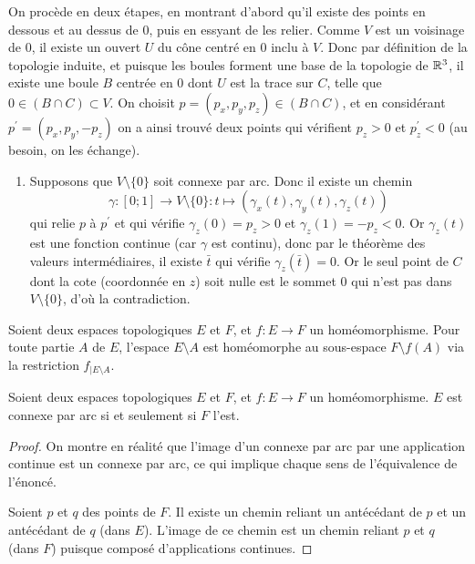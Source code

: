 On procède en deux étapes, en montrant d'abord qu'il
   existe des points en \og dessous\fg{} et au \og dessus\fg{} de
   $0$, puis en essyant de les relier.
     Comme $V$ est un voisinage de $0$, il existe un ouvert $U$ du
     cône centré en $0$ inclu à $V$. Donc par définition de la
     topologie induite, et puisque les boules forment une base de la
     topologie de $\mathbb{R}^3$, il existe une boule $B$ centrée en $0$ dont
     $U$ est la trace sur $C$, telle que $0 \in (B \cap C) \subset
     V$. On choisit $p = (p_x,p_y,p_z) \in (B \cap C)$, et en
     considérant $p^\prime = (p_x, p_y, -p_z)$ on a ainsi trouvé deux
     points qui vérifient $p_z > 0$ et $p^\prime_z < 0$ (au besoin,
     on les échange).

   \begin{enumerate}
   \item Supposons que $V\setminus\{0\}$ soit connexe par arc. Donc
     il existe un chemin
     \[\gamma : [0;1] \to V\setminus\{0\} : t \mapsto
     (\gamma_x(t),\gamma_y(t),\gamma_z(t))\] qui relie $p$ à
     $p^\prime$ et qui vérifie $\gamma_z(0) = p_z > 0$ et
     $\gamma_z(1) = -p_z < 0$. Or $\gamma_z(t)$ est une fonction
     continue (car $\gamma$ est continu), donc par le théorème des
     valeurs intermédiaires, il existe $\bar t$ qui vérifie
     $\gamma_z(\bar t) = 0$. Or le seul point de $C$ dont la cote
     (coordonnée en $z$) soit nulle est le sommet $0$ qui n'est pas
     dans $V\setminus\{0\}$, d'où la contradiction.
   \end{enumerate}

 \begin{rem}Soient deux espaces topologiques $E$ et $F$, et $f :
   E\to F$ un homéomorphisme. Pour toute partie $A$ de $E$,
   l'espace $E\setminus A$ est homéomorphe au sous-espace $F\setminus
   f(A)$ via la restriction $f_{\vert E\setminus A}$.\end{rem}

 \begin{lem}Soient deux espaces topologiques $E$ et $F$, et $f :
   E\to F$ un homéomorphisme. $E$ est connexe par arc si et
   seulement si $F$ l'est.\end{lem}
 \begin{proof}On montre en réalité que l'image d'un connexe par arc
   par une application continue est un connexe par arc, ce qui
   implique chaque sens de l'équivalence de l'énoncé.

   Soient $p$ et $q$ des points de $F$. Il existe un chemin reliant
   un antécédant de $p$ et un antécédant de $q$ (dans $E$). L'image
   de ce chemin est un chemin reliant $p$ et $q$ (dans $F$) puisque
   composé d'applications continues.
 \end{proof}

